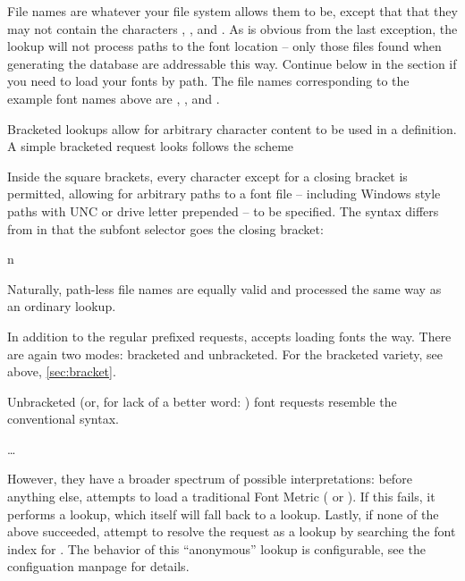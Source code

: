 File names are whatever your file system allows them to be, except
that that they may not contain the characters
  \inlinecode {(},
  \inlinecode {:}, and
  \inlinecode {/}.
%
As is obvious from the last exception, the  lookup will
not process paths to the font location -- only those
files found when generating the database are addressable this way.
%
Continue below in the \XETEX section if you need to load your fonts
by path.
%
The file names corresponding to the example font names above are
  ,
  , and
  .

\endsubsection

\label{sec:bracket}
Bracketed lookups allow for arbitrary character content to be used in a
definition.
%
A simple bracketed request looks follows the scheme

\beginnarrower
  \nonproportional{\string\font\string\fontname\space = [}%
  \nonproportional{]}
\endnarrower

\noindent
Inside the square brackets, every character except for a closing bracket is
permitted, allowing for  arbitrary paths to a font file -- including Windows
style paths with UNC or drive letter prepended -- to be specified.
%
The  syntax differs from \XETEX in that the subfont
selector goes  the closing bracket:

\beginnarrower
  \nonproportional{\string\font\string\fontname\space = [}%
  \nonproportional{]}
  \nonproportional{(}n\nonproportional{)}
\endnarrower

Naturally, path-less file names are equally valid and processed the
same way as an ordinary  lookup.


In addition to the regular prefixed requests, 
accepts loading fonts the \XETEX way.
%
There are again two modes: bracketed and unbracketed.
For the bracketed variety, see above, \ref{sec:bracket}.

Unbracketed (or, for lack of a better word: )
font requests resemble the conventional \TEX syntax.

\beginnarrower
  \nonproportional{\string\font\string\fontname\space= }%
  \dots
\endnarrower
\endsubsection

However, they have a broader spectrum of possible interpretations:
before anything else,  attempts to load a
traditional \TEX Font Metric ( or ).
%
If this fails, it performs a  lookup, which itself will
fall back to a  lookup.
%
Lastly, if none of the above succeeded, attempt to resolve the request as a
 lookup by searching the font index for .
%
The behavior of this “anonymous” lookup is configurable, see the configuation
manpage for details.

